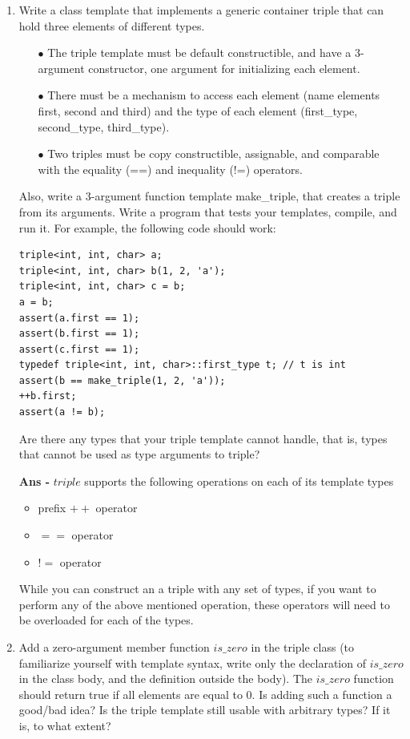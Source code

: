 \documentclass{article}
\begin{document}
\begin{enumerate}%

\item Write a class template that implements a generic container triple that can hold three elements of
different types.
\begin{itemize}
  \item[$\bullet$] The triple template must be default constructible, and have a 3-argument constructor, one argument for initializing each element.
  \item[$\bullet$] There must be a mechanism to access each element (name elements first, second and third)
and the type of each element (first\_type, second\_type, third\_type).
  \item[$\bullet$] Two triples must be copy constructible, assignable, and comparable with the equality (==) and
inequality (!=) operators.
\end{itemize}

Also, write a 3-argument function template make\_triple, that creates a triple from its arguments.
Write a program that tests your templates, compile, and run it. For example, the following code
should work:
\begin{lstlisting}
triple<int, int, char> a;
triple<int, int, char> b(1, 2, 'a');
triple<int, int, char> c = b;
a = b;
assert(a.first == 1);
assert(b.first == 1);
assert(c.first == 1);
typedef triple<int, int, char>::first_type t; // t is int
assert(b == make_triple(1, 2, 'a'));
++b.first;
assert(a != b);
\end{lstlisting}

Are there any types that your triple template cannot handle, that is, types that cannot be used as type arguments to triple?

\textbf{Ans - }$triple$ supports the following operations on each of its template types
\begin{itemize}
\item prefix $++$ operator
\item $==$ operator
\item $!=$ operator
\end{itemize}

While you can construct an a triple with any set of types, if you want to perform any of the above mentioned operation, these operators will need to be overloaded for each of the types.

\item Add a zero-argument member function $is\_zero$ in the triple class (to familiarize yourself with
template syntax, write only the declaration of $is\_zero$ in the class body, and the definition outside
the body). The $is\_zero$ function should return true if all elements are equal to 0.
Is adding such a function a good/bad idea? Is the triple template still usable with arbitrary types?
If it is, to what extent?


\end{enumerate}
\end{document}

